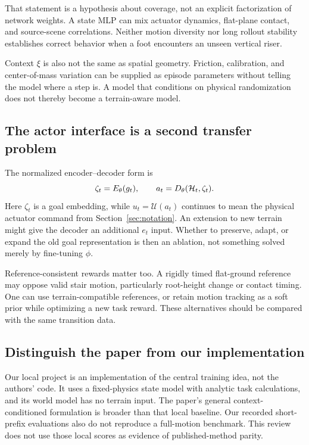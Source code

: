 That statement is a hypothesis about coverage, not an explicit factorization of
network weights. A state MLP can mix actuator dynamics, flat-plane contact, and
source-scene correlations. Neither motion diversity nor long rollout stability
establishes correct behavior when a foot encounters an unseen vertical riser.

Context $\xi$ is also not the same as spatial geometry. Friction, calibration,
and center-of-mass variation can be supplied as episode parameters without telling
the model where a step is. A model that conditions on physical randomization
does not thereby become a terrain-aware model.

\subsection{The actor interface is a second transfer problem}
The normalized encoder--decoder form is
\begin{equation}
\zeta_t=E_\theta(g_t),\qquad
a_t=D_\theta(\mathcal H_t,\zeta_t).
\end{equation}
Here $\zeta_t$ is a goal embedding, while $u_t=\mathcal U(a_t)$ continues to mean
the physical actuator command from Section~\ref{sec:notation}.
An extension to new terrain might give the decoder an additional $e_t$ input.
Whether to preserve, adapt, or expand the old goal representation is then an
ablation, not something solved merely by fine-tuning $\phi$.

Reference-consistent rewards matter too. A rigidly timed flat-ground reference
may oppose valid stair motion, particularly root-height change or contact timing.
One can use terrain-compatible references, or retain motion tracking as a soft
prior while optimizing a new task reward. These alternatives should be compared
with the same transition data.

\subsection{Distinguish the paper from our implementation}
Our local project is an implementation of the central training idea, not the
authors' code. It uses a fixed-physics state model with analytic task calculations,
and its world model has no terrain input. The paper's general context-conditioned
formulation is broader than that local baseline. Our recorded short-prefix
evaluations also do not reproduce a full-motion benchmark. This review does not
use those local scores as evidence of published-method parity.

